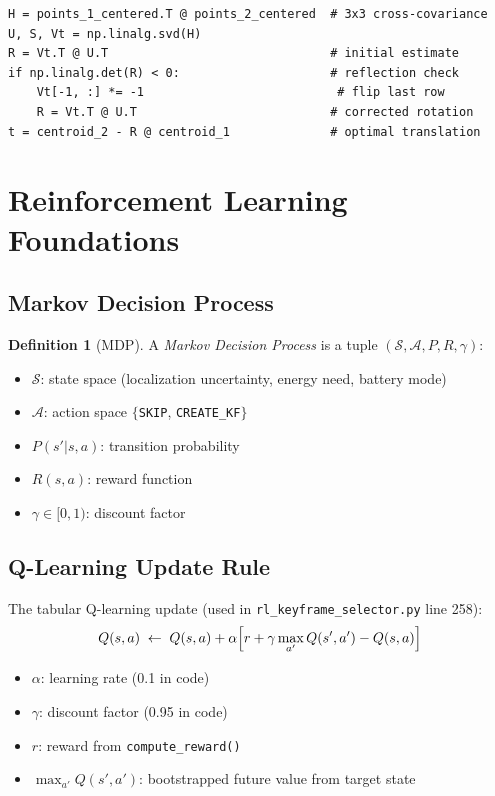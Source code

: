 \documentclass[12pt,a4paper,twoside]{report}
\theoremstyle{definition}
\newtheorem{definition}{Definition}[chapter]
\newcommand{\code}[1]{\texttt{#1}}
\newcommand{\file}[1]{\texttt{\textcolor{codeblue}{#1}}}
\begin{document}
\begin{lstlisting}
H = points_1_centered.T @ points_2_centered  # 3x3 cross-covariance
U, S, Vt = np.linalg.svd(H)
R = Vt.T @ U.T                               # initial estimate
if np.linalg.det(R) < 0:                     # reflection check
    Vt[-1, :] *= -1                           # flip last row
    R = Vt.T @ U.T                           # corrected rotation
t = centroid_2 - R @ centroid_1              # optimal translation
\end{lstlisting}

\section{Reinforcement Learning Foundations}

\subsection{Markov Decision Process}

\begin{definition}[MDP]
A \emph{Markov Decision Process} is a tuple $(\mathcal{S}, \mathcal{A}, P, R, \gamma)$:
\begin{itemize}
  \item $\mathcal{S}$: state space (localization uncertainty, energy need, battery mode)
  \item $\mathcal{A}$: action space $\{$\code{SKIP}, \code{CREATE\_KF}$\}$
  \item $P(s'|s,a)$: transition probability
  \item $R(s,a)$: reward function
  \item $\gamma \in [0,1)$: discount factor
\end{itemize}
\end{definition}

\subsection{Q-Learning Update Rule}

The tabular Q-learning update (used in \file{rl\_keyframe\_selector.py} line 258):
\[
  Q(s,a) \;\leftarrow\; Q(s,a) + \alpha \Bigl[ r + \gamma \max_{a'} Q(s',a') - Q(s,a) \Bigr]
\]
\begin{itemize}
  \item $\alpha$: learning rate (0.1 in code)
  \item $\gamma$: discount factor (0.95 in code)
  \item $r$: reward from \code{compute\_reward()}
  \item $\max_{a'} Q(s',a')$: bootstrapped future value from target state
\end{itemize}
\end{document}
